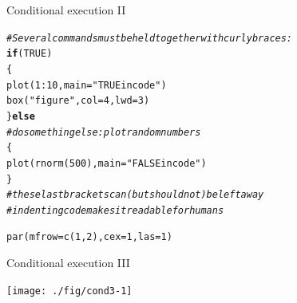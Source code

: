 \documentclass[xcolor=table,       handout,    xcolor=dvipsnames]{beamer}\usepackage[]{graphicx}\usepackage[]{color}
\makeatletter
\newcommand{\hlnum}[1]{\textcolor[rgb]{0,0,0}{#1}}
\newcommand{\hlstr}[1]{\textcolor[rgb]{0.545,0.137,0.137}{#1}}
\newcommand{\hlcom}[1]{\textcolor[rgb]{0,0.392,0}{\textit{#1}}}
\newcommand{\hlopt}[1]{\textcolor[rgb]{0,0,0}{#1}}
\newcommand{\hlstd}[1]{\textcolor[rgb]{0,0,0}{#1}}
\newcommand{\hlkwa}[1]{\textcolor[rgb]{1,0,0}{\textbf{#1}}}
\newcommand{\hlkwc}[1]{\textcolor[rgb]{1,0,1}{#1}}
\newcommand{\hlkwd}[1]{\textcolor[rgb]{0,0,1}{#1}}
\newenvironment{kframe}{%
 \def\at@end@of@kframe{}%
 \ifinner\ifhmode%
  \def\at@end@of@kframe{\end{minipage}}%
  \begin{minipage}{\columnwidth}%
 \fi\fi%
 \def\FrameCommand##1{\hskip\@totalleftmargin \hskip-\fboxsep
 \colorbox{shadecolor}{##1}\hskip-\fboxsep
     \hskip-\linewidth \hskip-\@totalleftmargin \hskip\columnwidth}%
 \MakeFramed {\advance\hsize-\width
   \@totalleftmargin\z@ \linewidth\hsize
   \@setminipage}}%
 {\par\unskip\endMakeFramed%
 \at@end@of@kframe}
\newenvironment{knitrout}{}{} %
\makeatother
\begin{document}
\begin{frame}[fragile]{Conditional execution II}
\begin{knitrout}
\color{fgcolor}\begin{kframe}
\begin{alltt}
\hlcom{# Several commands must be held together with curly braces:}
\hlkwa{if}\hlstd{(}\hlnum{TRUE}\hlstd{)}
  \hlstd{\{}
  \hlkwd{plot}\hlstd{(}\hlnum{1}\hlopt{:}\hlnum{10}\hlstd{,} \hlkwc{main}\hlstd{=}\hlstr{"TRUE in code"}\hlstd{)}
  \hlkwd{box}\hlstd{(}\hlstr{"figure"}\hlstd{,} \hlkwc{col}\hlstd{=}\hlnum{4}\hlstd{,} \hlkwc{lwd}\hlstd{=}\hlnum{3}\hlstd{)}
  \hlstd{\}} \hlkwa{else}
\hlcom{# do something else: plot random numbers}
    \hlstd{\{}
    \hlkwd{plot}\hlstd{(}\hlkwd{rnorm}\hlstd{(}\hlnum{500}\hlstd{),} \hlkwc{main}\hlstd{=}\hlstr{"FALSE in code"}\hlstd{)}
    \hlstd{\}}
\hlcom{# these last brackets can (but should not) be left away}
\hlcom{# indenting code makes it readable for humans}

\hlkwd{par}\hlstd{(}\hlkwc{mfrow}\hlstd{=}\hlkwd{c}\hlstd{(}\hlnum{1}\hlstd{,}\hlnum{2}\hlstd{),} \hlkwc{cex}\hlstd{=}\hlnum{1}\hlstd{,} \hlkwc{las}\hlstd{=}\hlnum{1}\hlstd{)}
\end{alltt}
\end{kframe}
\end{knitrout}
\end{frame}


\begin{frame}[fragile]{Conditional execution III}
\begin{knitrout}
\color{fgcolor}

{\centering \texttt{[image: ./fig/cond3-1]} 

}



\end{knitrout}
\end{frame}

\end{document}
